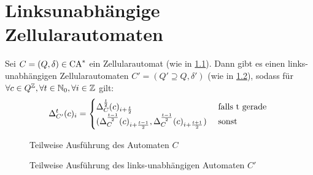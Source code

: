 \chapter{Linksunabhängige Zellularautomaten}
\label{chap:LinksunabhAuto}

\begin{satz}
    \label{zellautoZuLinksunabhaengig}
    Sei $C = (Q, \delta) \in \textrm{CA}^*$ ein Zellularautomat (wie in \cref{fig:NormalZuRechtsUnabh}).
    Dann gibt es einen links-unabhängigen Zellularautomaten $C' = (Q' \supseteq Q, \delta')$ (wie in \cref{fig:NormalZuRechtsUnabh2}),
    sodass
    für $\forall c \in Q^{\mathbb{Z}}, \forall t \in \mathbb{N}_0, \forall i \in \mathbb{Z}$ gilt:
    \[
            \Delta_{C'}^{t}(c)_i =
            \begin{cases}
                \Delta_C^{\frac{t}{2}}(c)_{i+\frac{t}{2}} & \text{ falls } $t$ \text{ gerade } \\
                (\Delta_C^{\frac{t - 1}{2}}(c)_{i+\frac{t - 1}{2}}, \Delta_C^{\frac{t-1}{2}}(c)_{i+\frac{t+1}{2}})  & \text{ sonst}
            \end{cases}
    \]
        

    \begin{figure}[h!]
        \centering
        
        \caption{Teilweise Ausführung des Automaten $C$}
        \label{fig:NormalZuRechtsUnabh}
    \end{figure}
   \begin{figure}[h!]
        \centering
        
        \caption{Teilweise Ausführung des links-unabhängigen Automaten $C'$}
        \label{fig:NormalZuRechtsUnabh2}
    \end{figure}

\end{satz}
